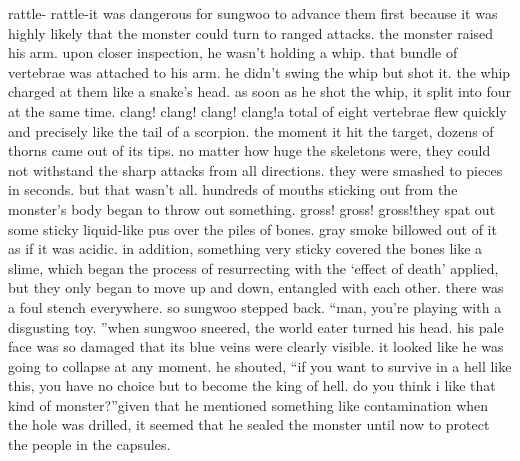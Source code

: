 rattle- rattle-it was dangerous for sungwoo to advance them first because it was highly likely that the monster could turn to ranged attacks.
the monster raised his arm.
 upon closer inspection, he wasn’t holding a whip.
 that bundle of vertebrae was attached to his arm.
he didn’t swing the whip but shot it.
 the whip charged at them like a snake’s head.
 as soon as he shot the whip, it split into four at the same time.
clang! clang! clang! clang!a total of eight vertebrae flew quickly and precisely like the tail of a scorpion.
 the moment it hit the target, dozens of thorns came out of its tips.
 no matter how huge the skeletons were, they could not withstand the sharp attacks from all directions.
 they were smashed to pieces in seconds.
 but that wasn’t all.
 hundreds of mouths sticking out from the monster’s body began to throw out something.
gross! gross! gross!they spat out some sticky liquid-like pus over the piles of bones.
 gray smoke billowed out of it as if it was acidic.
in addition, something very sticky covered the bones like a slime, which began the process of resurrecting with the ‘effect of death’ applied, but they only began to move up and down, entangled with each other.
there was a foul stench everywhere.
 so sungwoo stepped back.
“man, you’re playing with a disgusting toy.
”when sungwoo sneered, the world eater turned his head.
 his pale face was so damaged that its blue veins were clearly visible.
 it looked like he was going to collapse at any moment.
he shouted, “if you want to survive in a hell like this, you have no choice but to become the king of hell.
 do you think i like that kind of monster?”given that he mentioned something like contamination when the hole was drilled, it seemed that he sealed the monster until now to protect the people in the capsules.

